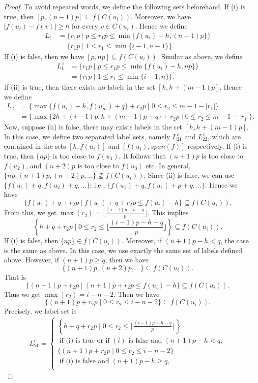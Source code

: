\begin{proof}
To avoid repeated words, we define the following sets beforehand. If (i) is true, then $[p, (n-1)p] \subseteq f(C(u_i))$. Moreover, we have $|f(u_i) - f(v)| \ge h$ for every $v \in C(u_i)$. Hence we define 
\begin{align*}
L_1 &= \{r_1p \mid p \le r_1p \le \min\{f(u_i)-h, (n-1)p\}\} \\
&=\{r_1p \mid 1 \le r_1 \le \min\{i-1, n-1\}\}.
\end{align*}
If (i) is false, then we have $[p,np] \subseteq f(C(u_i))$. Similar as above, we define 
\begin{align*}
L_1^{c} &= \{r_1p \mid p \le r_1p \le \min\{f(u_i)-h, np\}\}\\
&=\{r_1p \mid 1 \le r_1 \le \min\{i-1, n\}\}.
\end{align*}
If (ii) is true, then there exists no labels in the set $[h, h+(m-1)p]$. Hence we define 
\begin{align*}
L_2 &=\{\max\{f(u_i)+h, f(u_m)+q\} +r_2p \mid 0 \le r_2 \le m-1-|r_1|\}\\ 
&=\{\max\{2h+(i-1)p, h+(m-1)p+q\}+r_2p \mid 0 \le r_2 \le m-1-|r_1|\}.
\end{align*}
Now, suppose (ii) is false, there may exists labels in the set $[h, h+(m-1)p]$. In this case, we define two separated label sets, namely $L_{21}^c$ and $L_{22}^c$, which are contained in the sets $[h, f(u_i)]$ and $[f(u_i), span(f)]$ respectively. If (i) is true, then $\{np\}$ is too close to $f(u_1)$. It follows that $(n+1)p$ is too close to $f(u_2)$, and $(n+2)p$ is too close to $f(u_3)$ etc. In general, $\{np, (n+1)p, (n+2)p, \dots\} \not\subseteq f(C(u_i))$. Since (ii) is false, we can use $\{f(u_1) +q, f(u_2)+q, \dots\}$; i.e., $\{f(u_1)+q, f(u_1)+p+q, \dots\}$. Hence we have 
\[
\{f(u_1)+q +r_2p \mid f(u_1)+q+r_2p \le f(u_i)-h\} \subseteq f(C(u_i)).
\]
From this, we get $\max (r_2)=\lfloor \frac{(i-1)p-h-q}{p}\rfloor$. This implies 
\[
\left\{h+q+r_2p \mid 0 \le r_2 \le \lfloor \frac{(i-1)p-h-q}{p}\rfloor \right\} \subseteq f(C(u_i)).
\]
If (i) is false, then $\{np\} \in f(C(u_i))$. Moreover, if $(n+1)p-h <q$, the case is the same as above. In this case, we use exactly the same set of labels defined above. However, if $(n+1)p \ge q$, then we have 
\[
\{(n+1)p, (n+2)p, \dots \} \subseteq f(C(u_i)).
\]
That is
\[
\{(n+1)p+r_2p \mid (n+1)p+r_2p \le f(u_i)-h\} \subseteq f(C(u_i)).
\]
Thus we get $\max(r_2) = i-n-2$. Then we have 
\[
\{(n+1)p+r_2p \mid 0 \le r_2 \le i-n-2\} \subseteq f(C(u_i)).
\]
Precisely, we label set is 
\begin{align*}
L_{21}^{c} =
\begin{cases}
\left\{h+q+r_2p \mid 0 \le r_2 \le \lfloor \frac{(i-1)p-h-q}{p}\rfloor \right\} \\ \text{ if (i) is true or if } (i) \text{ is false and } (n+1)p-h <q,\\
\{(n+1)p+r_2p \mid 0 \le r_2 \le i-n-2\} \\ \text{ if (i) is false and } (n+1)p-h \ge q,\\
\end{cases}
\end{align*}


\end{proof}

